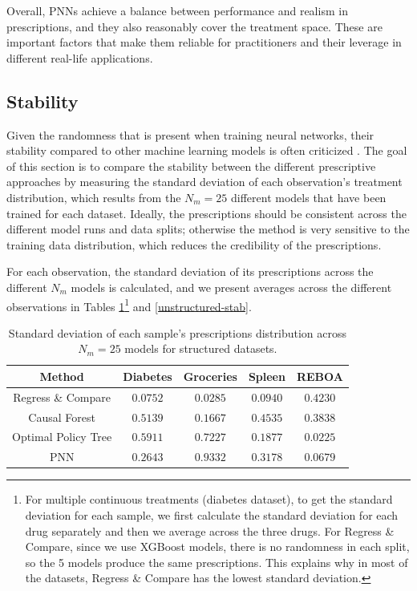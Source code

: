 \documentclass[10pt]{article} %
\begin{document}
Overall, PNNs achieve a balance between performance and realism in prescriptions, and they also reasonably cover the treatment space. These are important factors that make them reliable for practitioners and their leverage in different real-life applications.
\subsection{Stability}

Given the randomness that is present when training neural networks, their stability compared to other machine learning models is often criticized \citep{colbrook2022difficulty}. The goal of this section is to compare the stability between the different prescriptive approaches by measuring the standard deviation of each observation's treatment distribution, which results from the $N_m=25$ different models that have been trained for each dataset. Ideally, the prescriptions should be consistent across the different model runs and data splits; otherwise the method is very sensitive to the training data distribution, which reduces the credibility of the prescriptions. 

For each observation, the standard deviation of its prescriptions across the different $N_m$ models is calculated, and we present averages across the different observations in Tables \ref{structured-stab}\footnote{For multiple continuous treatments (diabetes dataset), to get the standard deviation for each sample, we first calculate the standard deviation for each drug separately and then we average across the three drugs. For Regress \& Compare, since we use XGBoost models, there is no randomness in each split, so the 5 models produce the same prescriptions. This explains why in most of the datasets, Regress \& Compare has the lowest standard deviation.} and \ref{unstructured-stab}.

\begin{table}[ht]\caption{Standard deviation of each sample's prescriptions distribution across $N_m=25$ models for structured datasets.}\label{structured-stab}
\begin{center}
\begin{tabular}{ccccc}
\textbf{Method}
& \textbf{Diabetes} & \textbf{Groceries} & \textbf{Spleen} & \textbf{REBOA} \\ \midrule
Regress \& Compare & $\mathbf{0.0752}$ & $\mathbf{0.0285}$ & $\mathbf{0.0940}$ & $0.4230$ \\ 
Causal Forest & $0.5139$ & $ 0.1667$ & $0.4535$ & $0.3838$\\ 
Optimal Policy Tree &$0.5911$& $0.7227$ & $0.1877$ & $\mathbf{0.0225}$\\ 
PNN & $0.2643$& $0.9332$ & $0.3178$& $0.0679$\\ 
\end{tabular}
\end{center}
\end{table}
\end{document}
